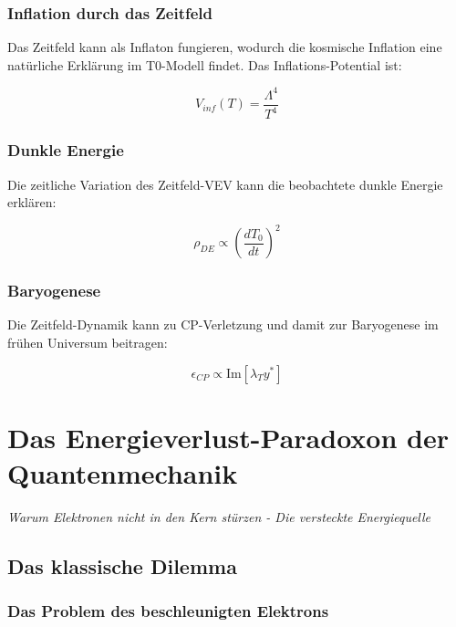 \documentclass[12pt,a4paper]{report}
\begin{document}
	\subsection{Inflation durch das Zeitfeld}
	
	Das Zeitfeld kann als Inflaton fungieren, wodurch die kosmische Inflation eine natürliche Erklärung im T0-Modell findet. Das Inflations-Potential ist:
	
	\begin{equation}
		V_{inf}(T) = \frac{\Lambda^4}{T^4}
	\end{equation}
	
	\subsection{Dunkle Energie}
	
	Die zeitliche Variation des Zeitfeld-VEV kann die beobachtete dunkle Energie erklären:
	
	\begin{equation}
		\rho_{DE} \propto \left(\frac{dT_0}{dt}\right)^2
	\end{equation}
	
	\subsection{Baryogenese}
	
	Die Zeitfeld-Dynamik kann zu CP-Verletzung und damit zur Baryogenese im frühen Universum beitragen:
	
	\begin{equation}
		\epsilon_{CP} \propto \text{Im}[\lambda_T y^*]
	\end{equation}
	
	\chapter{Das Energieverlust-Paradoxon der Quantenmechanik}
	\textit{Warum Elektronen nicht in den Kern stürzen - Die versteckte Energiequelle}
	
	\section{Das klassische Dilemma}
	
	\subsection{Das Problem des beschleunigten Elektrons}
	
\end{document}
